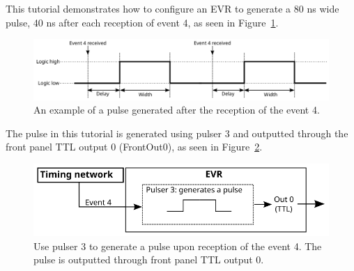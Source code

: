 \documentclass[12pt,a4paper]{article}
\begin{document}
This tutorial demonstrates how to configure an EVR to generate a 80 ns wide pulse, 40 ns after each reception of event 4, as seen in Figure~\ref{fig:pulser_signal}. 
\begin{figure}[H]
	\centering
	\includegraphics[width=\columnwidth]{./img/pulserSignal}
	\caption{An example of a pulse generated after the reception of the event 4.}
	\label{fig:pulser_signal}
\end{figure}
The pulse in this tutorial is generated using pulser 3 and outputted through the front panel TTL output 0 (FrontOut0), as seen in Figure~\ref{fig:pulser}. 

\begin{figure}[H]
	\centering
	\includegraphics[]{./img/pulser}
	\caption{Use pulser 3 to generate a pulse upon reception of the event 4. The pulse is outputted through front panel TTL output 0.}
	\label{fig:pulser}
\end{figure}
\end{document}
